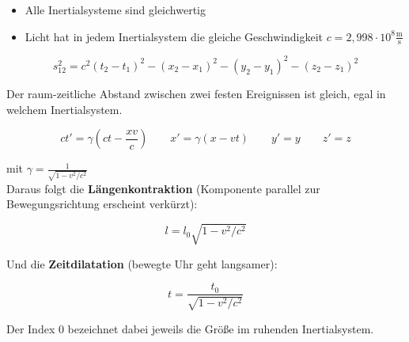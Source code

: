 \begin{framedthm}

	\begin{itemize}
		\item Alle Inertialsysteme sind gleichwertig
		\item Licht hat in jedem Inertialsystem die gleiche Geschwindigkeit $c = 2,998 \cdot 10^8 \frac{\textrm{m}}{\textrm{s}}$
	\end{itemize}
	
\end{framedthm}

\begin{frameddefn}
	
	\[ s_{12}^2 = c^2(t_2 - t_1)^2 - (x_2 - x_1)^2 - (y_2 - y_1)^2 - (z_2 - z_1)^2 \]
	
	Der raum-zeitliche Abstand zwischen zwei festen Ereignissen 	ist gleich, egal in welchem Inertialsystem.
	
\end{frameddefn}

\begin{frameddefn}[Lorentztransformation]
	
	\[ ct' = \gamma \left(ct - \frac{xv}{c}\right) \qquad x' = \gamma (x - vt) \qquad y' = y \qquad z' = z \]
	
	mit $\gamma = \frac{1}{\sqrt{1 - v^2/c^2}}$ \\
	
	Daraus folgt die \textbf{Längenkontraktion} (Komponente parallel zur Bewegungsrichtung erscheint verkürzt):
	
	\[ l = l_0 \sqrt{1-v^2/c^2} \]
	
	Und die \textbf{Zeitdilatation} (bewegte Uhr geht langsamer):
	
	\[ t = \frac{t_0}{\sqrt{1 - v^2/c^2}} \]
	
	Der Index 0 bezeichnet dabei jeweils die Größe im ruhenden Inertialsystem.
	
\end{frameddefn}